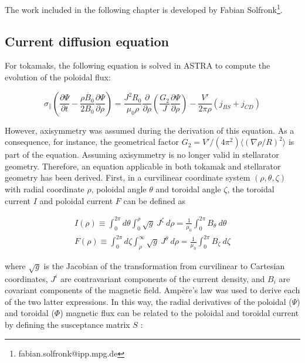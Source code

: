 The work included in the following chapter is developed by Fabian Solfronk\footnote{fabian.solfronk@ipp.mpg.de}.

\subsection{Current diffusion equation}

For tokamaks, the following equation is solved in ASTRA to compute the evolution of the poloidal flux:

\begin{equation}
    \label{tokcurrdiff}
     \sigma_\parallel \left( \frac{\partial \Psi}{\partial t} - \frac{\rho \dot{B_0}}{2 B_0} \frac{\partial \Psi}{\partial \rho} \right) = \frac{J^2 R_0}{\mu_0 \rho} \frac{\partial}{\partial \rho} \left( \frac{G_2}{J} \frac{\partial \Psi}{\partial \rho} \right) - \frac{V'}{2\pi \rho} \left( j_{BS} + j_{CD} \right)
\end{equation}

However, axisymmetry was assumed during the derivation of this equation. As a consequence, for instance, the geometrical factor $G_2 = V'/(4\pi^2) \langle \left( \nabla \rho/R \right)^2 \rangle$ is part of the equation. Assuming axisymmetry is no longer valid in stellarator geometry. Therefore, an equation applicable in both tokamak and stellarator geometry has been derived. \newline
First, in a curvilinear coordinate system $\left( \rho,\theta,\zeta\right)$ with radial coordinate $\rho$, poloidal angle $\theta$ and toroidal angle $\zeta$, the toroidal current $I$ and poloidal current $F$ can be defined as \cite{strand2001}

\begin{eqnarray}
I(\rho) \equiv \int^{2\pi}_0 d\theta \int^\rho_0 \sqrt{g} \ J^\zeta \ d\rho = \frac{1}{\mu_0} \int^{2\pi}_0 B_\theta \ d\theta\\
F(\rho) \equiv \int^{2\pi}_0 d\zeta \int^\infty_\rho \sqrt{g} \ J^\theta \ d\rho = \frac{1}{\mu_0} \int^{2\pi}_0 B_\zeta \ d\zeta \nonumber
\end{eqnarray}

where $\sqrt{g}$ is the Jacobian of the transformation from curvilinear to Cartesian coordinates, $J^i$ are contravariant components of the current density, and $B_i$ are covariant components of the magnetic field. Amp\`ere's law was used to derive each of the two latter expressions. In this way, the radial derivatives of the poloidal ($\Psi$) and toroidal ($\Phi$) magnetic flux can be related to the poloidal and toroidal current by defining the susceptance matrix $S$ \cite{strand2001}:


